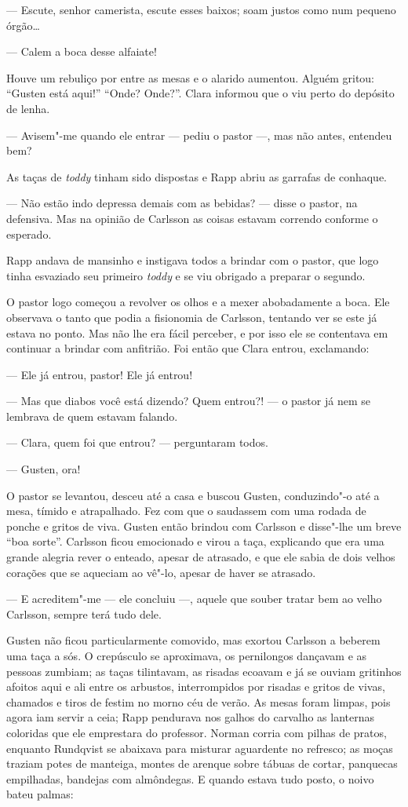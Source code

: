 --- Escute, senhor camerista, escute esses baixos; soam justos como num pequeno
órgão\ldots{}

--- Calem a boca desse alfaiate!

Houve um rebuliço por entre as mesas e o alarido aumentou. Alguém gritou:
``Gusten está aqui!'' ``Onde? Onde?''. Clara informou que o viu perto do depósito de
lenha.

--- Avisem"-me quando ele entrar --- pediu o pastor ---, mas não antes,
entendeu bem?

As taças de \textit{toddy} tinham sido dispostas e Rapp abriu as garrafas de conhaque.

--- Não estão indo depressa demais com as bebidas? --- disse o pastor, na defensiva. Mas
na opinião de Carlsson as coisas estavam correndo conforme o esperado.

Rapp andava de mansinho e instigava todos a brindar com o pastor, que logo tinha
esvaziado seu primeiro \textit{toddy} e se viu obrigado a preparar o segundo.

O pastor logo começou a revolver os olhos e a mexer abobadamente a boca. Ele 
observava o tanto que podia a fisionomia de Carlsson, tentando ver se este 
já estava no ponto. Mas não lhe era fácil perceber, e por isso ele se 
contentava em continuar a brindar com anfitrião. Foi então que Clara entrou, exclamando:

--- Ele já entrou, pastor! Ele já entrou!

--- Mas que diabos você está dizendo? Quem entrou?! --- o pastor já nem se lembrava
de quem estavam falando.

--- Clara, quem foi que entrou? --- perguntaram todos.

--- Gusten, ora!

O pastor se levantou, desceu até a casa e buscou Gusten, conduzindo"-o até a
mesa, tímido e atrapalhado. Fez com que o saudassem com uma rodada de ponche e
gritos de viva. Gusten então brindou com Carlsson e disse"-lhe um breve ``boa
sorte''. Carlsson ficou emocionado e virou a taça, explicando que era uma grande
alegria rever o enteado, apesar de atrasado, e que ele sabia de dois
velhos corações que se aqueciam ao vê"-lo, apesar de haver se atrasado.

--- E acreditem"-me --- ele concluiu ---, aquele que souber tratar bem ao velho
Carlsson, sempre terá tudo dele.

Gusten não ficou particularmente comovido, mas exortou Carlsson a 
beberem uma taça a sós. O crepúsculo se aproximava, os pernilongos
dançavam e as pessoas zumbiam; as taças tilintavam, as risadas ecoavam e já se
ouviam gritinhos afoitos aqui e ali entre os arbustos, interrompidos por risadas
e gritos de vivas, chamados e tiros de festim no morno céu de verão. As mesas
foram limpas, pois agora iam servir a ceia; Rapp pendurava nos galhos 
do carvalho as lanternas coloridas que ele emprestara do professor. Norman corria
com pilhas de pratos, enquanto Rundqvist se abaixava para misturar aguardente no
refresco; as moças traziam potes de manteiga, montes de arenque sobre tábuas de
cortar, panquecas empilhadas, bandejas com almôndegas. E quando estava tudo
posto, o noivo bateu palmas:

